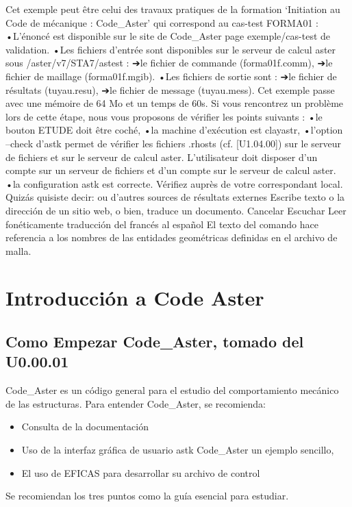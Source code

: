 \documentclass[12pt]{book}
\theoremstyle{definition}
\theoremstyle{remark}
\theoremstyle{plain}
\begin{document}
\begin{itemize}
Cet exemple peut être celui des travaux pratiques de la formation ‘Initiation au Code de mécanique : Code_Aster’ qui correspond au cas-test FORMA01 : •L’énoncé est disponible sur le site de Code_Aster page exemple/cas-test de validation. •Les fichiers d’entrée sont disponibles sur le serveur de calcul aster sous /aster/v7/STA7/astest : ➔le fichier de commande (forma01f.comm), ➔le fichier de maillage (forma01f.mgib). •Les fichiers de sortie sont : ➔le fichier de résultats (tuyau.resu), ➔le fichier de message (tuyau.mess). Cet exemple passe avec une mémoire de 64 Mo et un temps de 60s. Si vous rencontrez un problème lors de cette étape, nous vous proposons de vérifier les points suivants : •le bouton ETUDE doit être coché, •la machine d’exécution est clayastr, •l’option --check d’astk permet de vérifier les fichiers .rhosts (cf. [U1.04.00]) sur le serveur de fichiers et sur le serveur de calcul aster. L’utilisateur doit disposer d’un compte sur un serveur de fichiers et d’un compte sur le serveur de calcul aster. •la configuration astk est correcte. Vérifiez auprès de votre correspondant local.
Quizás quisiste decir: ou d'autres sources de résultats externes
Escribe texto o la dirección de un sitio web, o bien, traduce un documento.
Cancelar
Escuchar
Leer fonéticamente
traducción del francés al español
El texto del comando hace referencia a los nombres de las entidades geométricas definidas en el 
archivo de malla.
\end{itemize}


\chapter{Introducción a Code Aster}

\section{Como Empezar Code\_Aster, tomado del U0.00.01}
Code\_Aster es un código general para el estudio del comportamiento mecánico de 
las estructuras.
Para entender Code\_Aster, se recomienda:
\begin{itemize}
 \item Consulta de la documentación
 \item Uso de la interfaz gráfica de usuario astk Code\_Aster un ejemplo sencillo,
 \item El uso de EFICAS para desarrollar su archivo de control
\end{itemize}


Se recomiendan los tres puntos como la guía esencial para estudiar.
\end{document}
